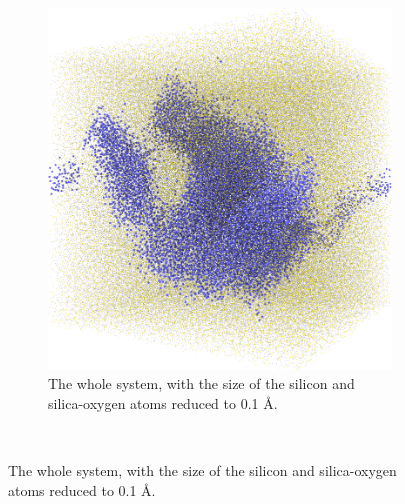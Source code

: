 \begin{figure}[!p]
{\begin{subfigure}[t]{\myfigwidth}
            \includegraphics[width=\textwidth]{images/systems/trimmed-rough_fracture03_05}%
            \caption{The whole system, with the size of the silicon and silica-oxygen atoms reduced to 0.1 \AA.}%
        \end{subfigure}%
    }%
    \vspace{10pt}\\%
\end{figure}
